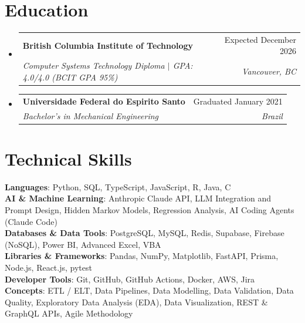 \documentclass[letterpaper,11pt]{article}
\makeatletter
\newcommand{\resumeSubheading}[4]{
  \vspace{-2pt}\item
    \begin{tabular*}{0.97\textwidth}[t]{l@{\extracolsep{\fill}}r}
      \textbf{#1} & #2 \\
      \textit{\small#3} & \textit{\small #4} \\
    \end{tabular*}\vspace{-7pt}
}
\newcommand{\resumeSubHeadingListStart}{\begin{itemize}[leftmargin=0.15in, label={}]}
\newcommand{\resumeSubHeadingListEnd}{\end{itemize}}
\makeatother
\begin{document}
\section{Education}
  \resumeSubHeadingListStart
    \resumeSubheading
      {British Columbia Institute of Technology}{Expected December 2026}
      {Computer Systems Technology Diploma $|$ \textup{GPA: 4.0/4.0 (BCIT GPA 95\%)}}{Vancouver, BC}
    \resumeSubheading
      {Universidade Federal do Espirito Santo}{Graduated January 2021}
      {Bachelor's in Mechanical Engineering}{Brazil}
  \resumeSubHeadingListEnd

%
\section{Technical Skills}
 \begin{itemize}[leftmargin=0.15in, label={}]
    \small{\item{

     \textbf{Languages}{: Python, SQL, TypeScript, JavaScript, R, Java, C} \\

     \textbf{AI \& Machine Learning}{: Anthropic Claude API, LLM Integration and Prompt Design, Hidden Markov Models, Regression Analysis, AI Coding Agents (Claude Code)} \\

     \textbf{Databases \& Data Tools}{: PostgreSQL, MySQL, Redis, Supabase, Firebase (NoSQL), Power BI, Advanced Excel, VBA} \\

     \textbf{Libraries \& Frameworks}{: Pandas, NumPy, Matplotlib, FastAPI, Prisma, Node.js, React.js, pytest} \\

     \textbf{Developer Tools}{: Git, GitHub, GitHub Actions, Docker, AWS, Jira} \\

     \textbf{Concepts}{: ETL / ELT, Data Pipelines, Data Modelling, Data Validation, Data Quality, Exploratory Data Analysis (EDA), Data Visualization, REST \& GraphQL APIs, Agile Methodology}
    
    }}
 \end{itemize}


\end{document}
